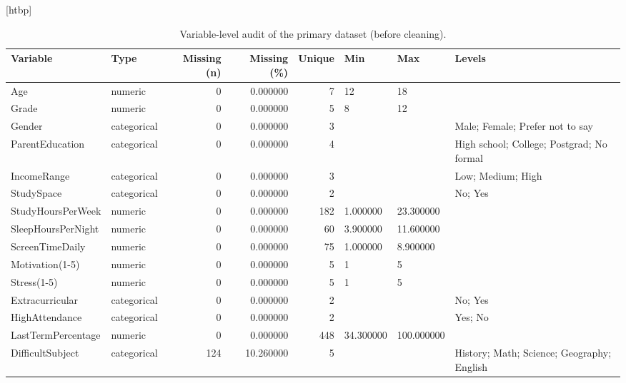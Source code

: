 \begin{table}
\small[htbp]
\caption{Variable-level audit of the primary dataset (before cleaning).}
\label{tab:S01_data_audit}
\begin{tabular}{llrrrlll}
\toprule
Variable & Type & Missing (n) & Missing (\%) & Unique & Min & Max & Levels \\
\midrule
Age & numeric & 0 & 0.000000 & 7 & 12 & 18 &  \\
Grade & numeric & 0 & 0.000000 & 5 & 8 & 12 &  \\
Gender & categorical & 0 & 0.000000 & 3 &  &  & Male; Female; Prefer not to say \\
ParentEducation & categorical & 0 & 0.000000 & 4 &  &  & High school; College; Postgrad; No formal \\
IncomeRange & categorical & 0 & 0.000000 & 3 &  &  & Low; Medium; High \\
StudySpace & categorical & 0 & 0.000000 & 2 &  &  & No; Yes \\
StudyHoursPerWeek & numeric & 0 & 0.000000 & 182 & 1.000000 & 23.300000 &  \\
SleepHoursPerNight & numeric & 0 & 0.000000 & 60 & 3.900000 & 11.600000 &  \\
ScreenTimeDaily & numeric & 0 & 0.000000 & 75 & 1.000000 & 8.900000 &  \\
Motivation(1-5) & numeric & 0 & 0.000000 & 5 & 1 & 5 &  \\
Stress(1-5) & numeric & 0 & 0.000000 & 5 & 1 & 5 &  \\
Extracurricular & categorical & 0 & 0.000000 & 2 &  &  & No; Yes \\
HighAttendance & categorical & 0 & 0.000000 & 2 &  &  & Yes; No \\
LastTermPercentage & numeric & 0 & 0.000000 & 448 & 34.300000 & 100.000000 &  \\
DifficultSubject & categorical & 124 & 10.260000 & 5 &  &  & History; Math; Science; Geography; English \\
\bottomrule
\end{tabular}
\end{table}
